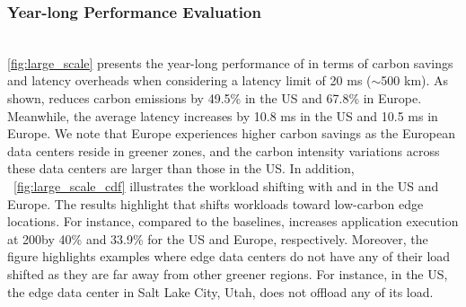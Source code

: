 

\subsubsection{Year-long Performance Evaluation}\label{sec:eval_understanding}\hfill\\
\autoref{fig:large_scale} presents the year-long performance of \proposedsystem in terms of carbon savings and latency overheads when considering a latency limit of 20 ms ($\sim$500 km). As shown, \proposedsystem reduces carbon emissions by 49.5\% in the US and 67.8\% in Europe. Meanwhile, the average latency increases by 10.8 ms in the US and 10.5 ms in Europe. We note that Europe experiences higher carbon savings as the European data centers reside in greener zones, and the carbon intensity variations across these data centers are larger than those in the US. In addition, ~\autoref{fig:large_scale_cdf} illustrates the workload shifting with \latencyaware and \proposedsystem in the US and Europe. The results highlight that \proposedsystem shifts workloads toward low-carbon edge locations. For instance, compared to the \latencyaware baselines, \proposedsystem increases application execution at 200\emissionunit by 40\% and 33.9\% for the US and Europe, respectively. Moreover, the figure highlights examples where edge data centers do not have any of their load shifted as they are far away from other greener regions. For instance, in the US, the edge data center in Salt Lake City, Utah, does not offload any of its load.



